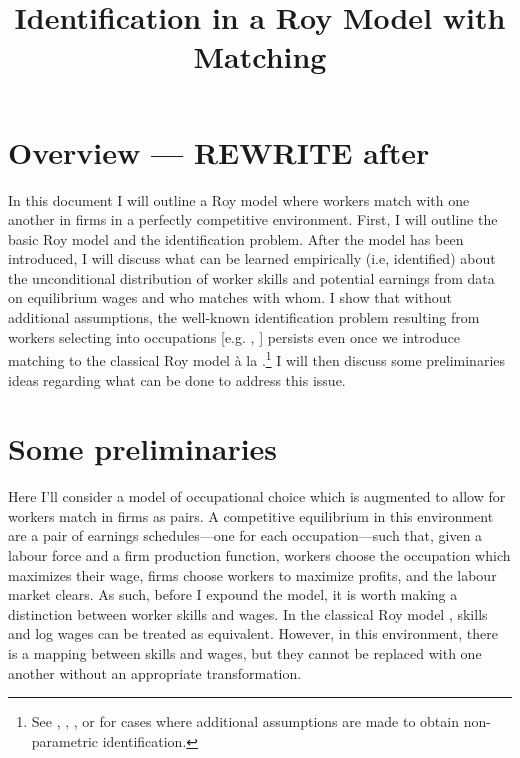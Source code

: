 \documentclass[12 pt]{article}
\title{Identification in a Roy Model with Matching}
\author{}
\date{}
\begin{document}
\maketitle
\vspace*{-2cm}
\onehalfspacing

\section{Overview --- REWRITE after}

In this document I will outline a Roy model where workers match with one another in firms in a perfectly competitive environment. First, I will outline the basic Roy model and the identification problem. After the model has been introduced, I will discuss what can be learned empirically (i.e, identified) about the unconditional distribution of worker skills and potential earnings from data on equilibrium wages and who matches with whom. I show that without additional assumptions, the well-known identification problem resulting from workers selecting into occupations [e.g. \citet{heckman1990empirical}, \citet{french2011identification}] persists even once we introduce matching to the classical Roy model \`{a} la \citet{mak2025occupational}.\footnote{See \citet{heckman1990empirical}, \citet{bayer2011nonparametric}, \citet{buera2006non}, or \citet{mourifie2020sharp} for cases where additional assumptions are made to obtain non-parametric identification.} I will then discuss some preliminaries ideas regarding what can be done to address this issue.  

\section{Some preliminaries}

Here I'll consider a model of occupational choice \citep{roy1951some} which is augmented to allow for workers match in firms as pairs. A competitive equilibrium in this environment are a pair of earnings schedules---one for each occupation---such that, given a labour force and a firm production function, workers choose the occupation which maximizes their wage, firms choose workers to maximize profits, and the labour market clears. As such, before I expound the model, it is worth making a distinction between worker skills and wages. In the classical Roy model \citep{heckman1990empirical}, skills and log wages can be treated as equivalent. However, in this environment, there is a mapping between skills and wages, but they cannot be replaced with one another without an appropriate transformation. 
\end{document}
